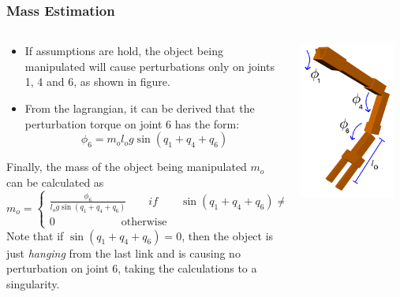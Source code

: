 \documentclass[9pt,spanish,aspectratio=1610]{beamer}
\begin{document}
\begin{frame}\frametitle{Mass Estimation}
  \begin{columns}
    \begin{column}{0.6\textwidth}
      \begin{itemize}
      \item If assumptions are hold, the object being manipulated will cause perturbations only on joints 1, 4 and 6, as shown in figure.
      \item From the lagrangian, it can be derived that the perturbation torque on joint 6 has the form:
        \[\phi_6 = m_o l_o g \sin (q_1 + q_4 + q_6)\]
      \end{itemize}
Finally, the mass of the object being manipulated $m_o$ can be calculated as
\begin{equation}
  m_o = \begin{cases}
    \frac{\phi_6}{l_o g \sin(q_1 + q_4 + q_6)} \qquad if\qquad \sin(q_1 + q_4 + q_6) \neq 0\\
    0 \qquad\qquad\qquad \textrm{otherwise}
    \end{cases}
  \end{equation}
Note that if $\sin(q_1 +q_4 + q_6) = 0$, then the object is just \textit{hanging} from the last link and is causing no perturbation on joint 6, taking the calculations to a singularity. 
    \end{column}
    \begin{column}{0.3\textwidth}
      \includegraphics[width=0.9\textwidth]{Figures/left_arm_phi.png}

\end{column}
\end{columns}
\end{frame}
\end{document}
